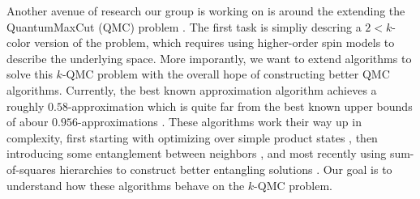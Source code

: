 \documentclass{article}
\begin{document}
Another avenue of research our group is working on is around the extending the QuantumMaxCut (QMC) problem \cite{GP19}. The first task is simpliy descring a $2 < k$-color version of the problem, which requires using higher-order spin models to describe the underlying space. More imporantly, we want to extend algorithms to solve this $k$-QMC problem with the overall hope of constructing better QMC algorithms. Currently, the best known approximation algorithm achieves a roughly $0.58$-approximation \cite{king} which is quite far from the best known upper bounds of abour $0.956$-approximations \cite{UGC}. These algorithms work their way up in complexity, first starting with optimizing over simple product states \cite{GP19, PT22}, then introducing some entanglement between neighbors \cite{AGM}, and most recently using sum-of-squares hierarchies to construct better entangling solutions \cite{PT22, king}. Our goal is to understand how these algorithms behave on the $k$-QMC problem.



\end{document}
